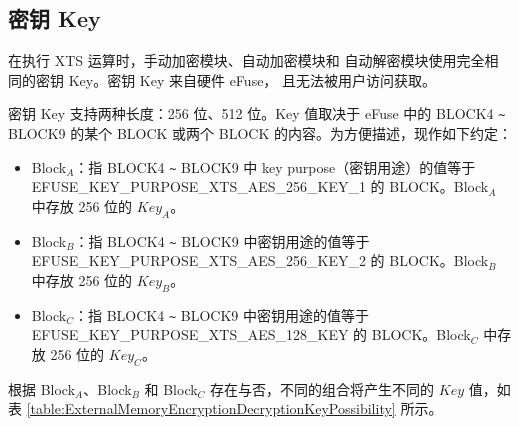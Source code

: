 \documentclass[main\_\_CN.tex]{subfiles}
\begin{document}
\subsection{密钥 Key} \label{XTS Key}

在执行 XTS 运算时，手动加密模块、自动加密模块和 自动解密模块使用完全相同的密钥 Key。密钥 Key 来自硬件 eFuse， 且无法被用户访问获取。

密钥 Key 支持两种长度：256 位、512 位。Key 值取决于 eFuse 中的 BLOCK4 \verb+~+ BLOCK9 的某个 BLOCK 或两个 BLOCK 的内容。为方便描述，现作如下约定：
\begin{itemize}
    \item Block$_A$：指 BLOCK4 \verb+~+ BLOCK9 中 key purpose（密钥用途）的值等于 EFUSE\_KEY\_PURPOSE\_XTS\_AES\_256\_KEY\_1 的 BLOCK。Block$_A$ 中存放 256 位的 \begin{math}Key_{A}\end{math}。

    \item Block$_B$：指 BLOCK4 \verb+~+ BLOCK9 中密钥用途的值等于 EFUSE\_KEY\_PURPOSE\_XTS\_AES\_256\_KEY\_2 的 BLOCK。Block$_B$ 中存放 256 位的 \begin{math}Key_{B}\end{math}。

    \item Block$_C$：指 BLOCK4 \verb+~+ BLOCK9 中密钥用途的值等于 EFUSE\_KEY\_PURPOSE\_XTS\_AES\_128\_KEY 的 BLOCK。Block$_C$ 中存放 256 位的 \begin{math}Key_{C}\end{math}。
\end{itemize}



根据 Block$_A$、Block$_B$ 和 Block$_C$ 存在与否，不同的组合将产生不同的 \begin{math}Key\end{math} 值，如表 \ref{table:ExternalMemoryEncryptionDecryptionKeyPossibility} 所示。
\end{document}
